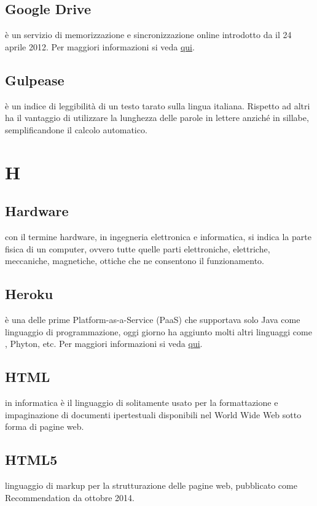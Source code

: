 \documentclass[12pt,a4paper]{article}
\begin{document}
\subsection{Google Drive} 
 è un servizio di memorizzazione e sincronizzazione online introdotto da  il 24 aprile 2012. Per maggiori informazioni si veda \href{https://it.wikipedia.org/wiki/Google_Drive}{qui}.

\subsection{Gulpease} 
 è un indice di leggibilità di un testo tarato sulla lingua italiana. Rispetto ad altri ha il vantaggio di utilizzare la lunghezza delle parole in lettere anziché in sillabe, semplificandone il calcolo automatico.


\newpage

\section{H}


\subsection{Hardware} 
con il termine hardware, in ingegneria elettronica e informatica, si indica la parte fisica di un computer, ovvero tutte quelle parti elettroniche, elettriche, meccaniche, magnetiche, ottiche che ne consentono il funzionamento.	

\subsection{Heroku} 
 è una  delle prime  Platform-as-a-Service (PaaS) che supportava solo Java come linguaggio di programmazione, oggi giorno ha aggiunto molti altri linguaggi come , Phyton, etc. Per maggiori informazioni si veda \href{https://www.heroku.com}{qui}.

\subsection{HTML} 
 in informatica è il linguaggio di  solitamente usato per la formattazione e impaginazione di documenti ipertestuali disponibili nel World Wide Web sotto forma di pagine web.

\subsection{HTML5} 
 linguaggio di markup per la strutturazione delle pagine web, pubblicato come  Recommendation da ottobre 2014.
\end{document}
